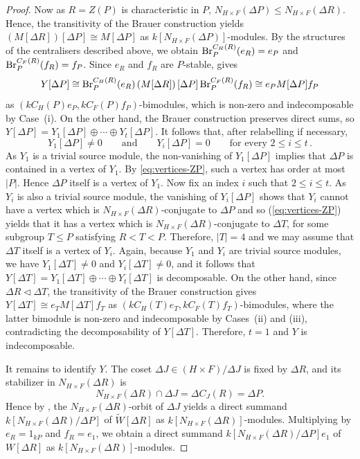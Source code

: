 \begin{proof}
Now as $R=Z(P)$ is characteristic in $P$, $N_{H\times F}(\Delta P)\le N_{H\times F}(\Delta R)$. Hence, the transitivity of the Brauer construction \cite[Proposition~5.8.5]{LinckelmannVol1} yields $(M[\Delta R])[\Delta P]\cong M[\Delta P]$ as $k[N_{H\times F}(\Delta P)]$-modules. By the structures of the centralisers described above, we obtain $\operatorname{Br}^{C_H(R)}_P(e_R)=e_P$ and $\operatorname{Br}^{C_F(R)}_P(f_R)=f_P$. Since $e_R$ and $f_R$ are $P$-stable, \cite[Lemma~3.7]{BoltjePerepelitsky} gives
\[
Y[\Delta P]\cong \operatorname{Br}_P^{C_H(R)}(e_R)\left(M[\Delta R]\right)[\Delta P]\operatorname{Br}_P^{C_F(R)}(f_R)\cong e_PM[\Delta P]f_P
\]
as $(kC_H(P)e_P, kC_F(P)f_P)$-bimodules, which is non-zero and indecomposable by Case~{\rm (i)}. On the other hand, the Brauer construction preserves direct sums, so $Y[\Delta P]=Y_1[\Delta P]\oplus\cdots\oplus Y_t[\Delta P]$. It follows that, after relabelling if necessary,
\[
Y_1[\Delta P]\neq 0\qquad\text{and}\qquad Y_i[\Delta P]=0 \qquad \text{for every } 2\le i\le t\,.
\]
As $Y_1$ is a trivial source module, the non-vanishing of $Y_1[\Delta P]$ implies that $\Delta P$ is contained in a vertex of $Y_1$. By \eqref{eq:vertices-ZP}, such a vertex has order at most $|P|$. Hence $\Delta P$ itself is a vertex of $Y_1$. Now fix an index $i$ such that $2\le i\le t$. As $Y_i$ is also a trivial source module, the vanishing of $Y_i[\Delta P]$ shows that $Y_i$ cannot have a vertex which is $N_{H\times F}(\Delta R)$-conjugate to $\Delta P$ and so (\ref{eq:vertices-ZP}) yields that it has a vertex which is $N_{H\times F}(\Delta R)$-conjugate to $\Delta T$, for some subgroup $T\le P$ satisfying $R<T<P$. Therefore, $|T|=4$ and we may assume that $\Delta T$ itself is a vertex of $Y_i$. Again, because $Y_1$ and $Y_i$ are trivial source modules, we have $Y_1[\Delta T]\neq 0$ and $Y_i[\Delta T]\neq 0$, and it follows that $Y[\Delta T]=Y_1[\Delta T]\oplus\cdots\oplus Y_t[\Delta T]$ is decomposable. On the other hand, since $\Delta R\lhd\Delta T$, the transitivity of the Brauer construction gives $Y[\Delta T]\cong e_TM[\Delta T]f_T$ as $(kC_H(T)e_T,kC_F(T)f_T)$-bimodules, where the latter bimodule is non-zero and indecomposable by Cases~{\rm (ii)} and {\rm (iii)}, contradicting the decomposability of $Y[\Delta T]$. Therefore, $t=1$ and $Y$ is indecomposable.

It remains to identify $Y$. The coset $\Delta J\in (H\times F)/\Delta J$ is fixed by $\Delta R$, and its stabilizer in $N_{H\times F}(\Delta R)$ is
\[
N_{H\times F}(\Delta R)\cap\Delta J=\Delta C_J(R)=\Delta P.
\]
Hence by \cite[Proposition~5.8.1]{LinckelmannVol1}, the $N_{H\times F}(\Delta R)$-orbit of $\Delta J$ yields a direct summand $k[N_{H\times F}(\Delta R)/\Delta P]$ of $\widetilde W[\Delta R]$ as $k[N_{H\times F}(\Delta R)]$-modules. Multiplying by $e_R=1_{kP}$ and $f_R=e_1$, we obtain a direct summand $k[N_{H\times F}(\Delta R)/\Delta P]e_1$ of $W[\Delta R]$ as $k[N_{H\times F}(\Delta R)]$-modules.


\end{proof}
